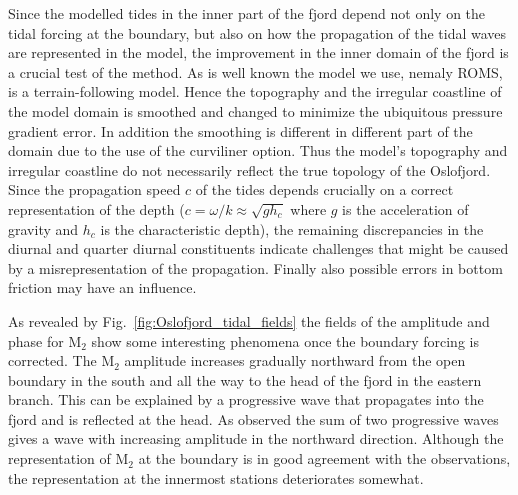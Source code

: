 Since the modelled tides in the inner part of the fjord depend not only on the tidal forcing at the boundary, but also on how the propagation of the tidal waves are represented in the model, the improvement in the inner domain of the fjord is a crucial test of the method. As is well known the model we use, nemaly ROMS, is a terrain-following model. Hence the topography and the irregular coastline of the model domain is smoothed and changed to minimize the ubiquitous pressure gradient error. In addition the smoothing is different in different part of the domain due to the use of the curviliner option. Thus the model's topography and irregular coastline do not necessarily reflect the true topology of the Oslofjord. Since the propagation speed $c$ of the tides depends crucially on a correct representation of the depth ($c = \omega/k \approx \sqrt{g h_c}$ where $g$ is the acceleration of gravity and $h_c$ is the characteristic depth), the remaining  discrepancies in the diurnal and quarter diurnal constituents indicate challenges that might be caused by a misrepresentation of the propagation. Finally also possible errors in bottom friction may have an influence.


As revealed by Fig.~\ref{fig:Oslofjord_tidal_fields} the fields of the amplitude and phase for M$_2$ show some interesting phenomena once the boundary forcing is corrected. The M$_2$ amplitude increases gradually northward from the open boundary in the south and all the way to the head of the fjord in the eastern branch. This can be explained by a progressive wave that propagates into the fjord and is reflected at the head. As observed the sum of two progressive waves gives a wave with increasing amplitude in the northward direction. Although the representation of M$_2$ at the boundary is in good agreement with the observations, the representation at the innermost stations deteriorates somewhat.

